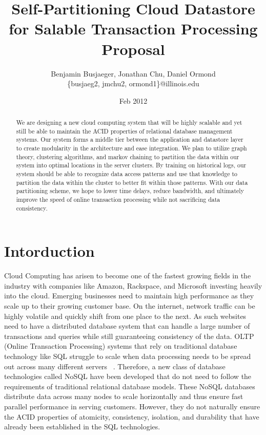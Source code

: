 \documentclass[10pt,final,journal]{IEEEtran}
\begin{document}
\title{Self-Partitioning Cloud Datastore for Salable Transaction Processing Proposal}
\author{Benjamin Busjaeger, Jonathan Chu, Daniel Ormond \\
\{busjaeg2, jmchu2, ormond1\}@illinois.edu}
\date{Feb 2012}
\maketitle

\begin{abstract}
We are designing a new cloud computing system that will be highly scalable and yet still be able to maintain the ACID properties of relational database management systems. Our system forms a middle tier between the application and datastore layer to create modularity in the architecture and ease integration. We plan to utilize graph theory, clustering algorithms, and markov chaining to partition the data within our system into optimal locations in the server clusters. By training on historical logs, our system should be able to recognize data access patterns and use that knowledge to partition the data within the cluster to better fit within those patterns. With our data partitioning scheme, we hope to lower time delays, reduce bandwidth, and ultimately improve the speed of online transaction processing while not sacrificing data consistency.
\end{abstract}


\section{Intorduction}
Cloud Computing has arisen to become one of the fastest growing fields in the industry with companies like Amazon, Rackspace, and Microsoft investing heavily into the cloud. Emerging businesses need to maintain high performance as they scale up to their growing customer base. On the internet, network traffic can be highly volatile and quickly shift from one place to the next. As such websites need to have a distributed database system that can handle a large number of transactions and queries while still guaranteeing consistency of the data. OLTP (Online Transaction Processing) systems that rely on traditional database technology like SQL struggle to scale when data processing needs to be spread out across many different servers ~\cite{Malkowski:2010:EAD:1774088.1774449}. Therefore, a new class of database technologies called NoSQL have been developed that do not need to follow the requirements of traditional relational database models. These NoSQL databases distribute data across many nodes to scale horizontally and thus ensure fast parallel performance in serving customers.  However, they do not naturally ensure the ACID properties of atomicity, consistency, isolation, and durability that have already been established in the SQL technologies.
\end{document}
